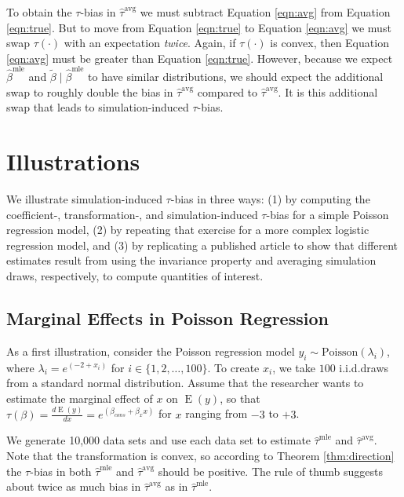 \documentclass[11pt]{article}
\DeclareMathOperator*{\E}{\text{E}}
\begin{document}
To obtain the $\tau$-bias in $\hat{\tau}^\text{avg}$ we must subtract Equation \ref{eqn:avg} from Equation \ref{eqn:true}.
But to move from Equation \ref{eqn:true} to Equation \ref{eqn:avg} we must swap $\tau(\cdot)$ with an expectation \emph{twice}.
Again, if $\tau(\cdot)$ is convex, then Equation \ref{eqn:avg} must be greater than Equation \ref{eqn:true}.
However, because we expect $\hat{\beta}^\text{mle}$ and $\tilde{\beta} \mid \hat{\beta}^\text{mle}$ to have similar distributions, we should expect the additional swap to roughly double the bias in $\hat{\tau}^\text{avg}$ compared to $\hat{\tau}^\text{avg}$. It is this additional swap that leads to simulation-induced $\tau$-bias.

\section*{Illustrations}

We illustrate simulation-induced $\tau$-bias in three ways: (1) by computing the coefficient-, transformation-, and simulation-induced $\tau$-bias for a simple Poisson regression model, (2) by repeating that exercise for a more complex logistic regression model, and (3) by replicating a published article to show that different estimates result from using the invariance property and averaging simulation draws, respectively, to compute quantities of interest.


\subsection*{Marginal Effects in Poisson Regression}

As a first illustration, consider the Poisson regression model $y_i \sim \text{Poisson}(\lambda_i)$, where $\lambda_i = e^{(-2 + x_i)}$ for $i \in \{1, 2,\ldots, 100\}$.
To create $x_i$, we take $100$ i.i.d.\@ draws from a standard normal distribution.
Assume that the researcher wants to estimate the marginal effect of $x$ on $\E(y)$, so that $\tau(\beta) = \frac{d \E (y)}{dx} = e^{(\beta_{cons} + \beta_x x)}$ for $x$ ranging from $-3$ to $+3$.

We generate 10,000 data sets and use each data set to estimate $\hat{\tau}^\text{mle}$ and $\hat{\tau}^\text{avg}$.
Note that the transformation is convex, so according to Theorem \ref{thm:direction} the $\tau$-bias in both $\hat{\tau}^\text{mle}$ and $\hat{\tau}^\text{avg}$ should be positive.
The rule of thumb suggests about twice as much bias in $\hat{\tau}^\text{avg}$ as in $\hat{\tau}^\text{mle}$.
\end{document}
